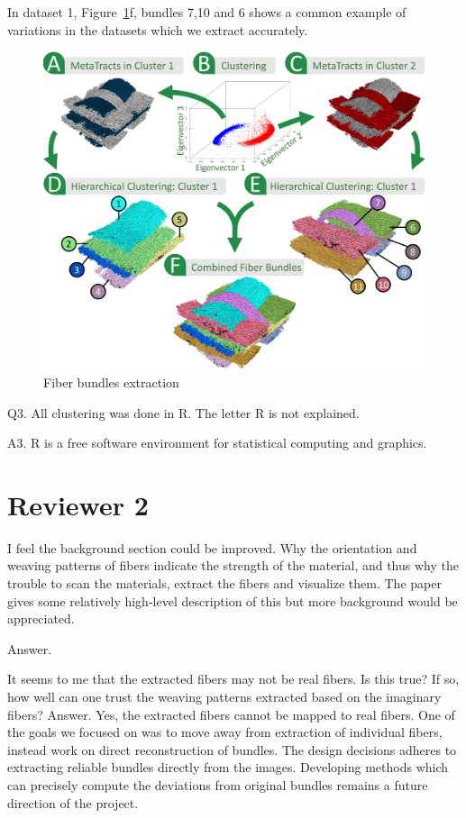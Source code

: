 \documentclass[]{article}
\begin{document}
In dataset 1, Figure~\ref{fig:angle_bundles}f, bundles 7,10 and 6 shows a common example of variations in the datasets which we extract accurately. 
\begin{figure}
\centering
\includegraphics[width=0.7\linewidth]{images_pvis/clustering.pdf}
\caption{Fiber bundles extraction}
\label{fig:angle_bundles}
\end{figure}
  

\color{red}
Q3. All clustering was done in R. The letter R is not explained.
\color{black}

A3. R is a free software environment for statistical computing and graphics.

\section{Reviewer 2}
\color{red}
I feel the background section could be improved. Why the orientation and weaving patterns of fibers indicate the strength of the material, and thus why the trouble to scan the materials, extract the fibers and visualize them. The paper gives some relatively high-level description of this but more background would be appreciated.


\color{black}
Answer.

\color{red}
  It seems to me that the extracted fibers may not be real fibers. Is this
  true? If so, how well can one trust the weaving patterns extracted based
  on the imaginary fibers? 
  \color{black}
  Answer. 
Yes, the extracted fibers cannot be mapped to real fibers. One of the goals  we  focused on was to move away from extraction of individual fibers, instead work on direct reconstruction of bundles. The design decisions adheres to extracting reliable bundles directly from the images. 
 Developing methods which can precisely compute the deviations from original bundles remains a future direction of the project. 
\end{document}
